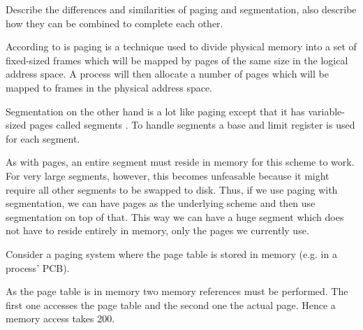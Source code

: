 \documentclass[a4paper]{miunasgn}
\theoremstyle{definition}
\begin{document}
\begin{questions}
	\question\label{q:segmentpaging}
	Describe the differences and similarities of paging and segmentation,
	also describe how they can be combined to complete each other.
	\begin{solution}
		According to \citet[sec. 8.4.1]{Silberschatz2009osc} is paging is 
		a technique used to divide physical memory into a set of fixed-sized frames 
		which will be mapped by pages of the same size in the logical address 
		space.
		A process will then allocate a number of pages which will be mapped to 
		frames in the physical address space.

		Segmentation on the other hand is a lot like paging except that it has 
		variable-sized pages called segments \citep[sec.  
		8.6.1]{Silberschatz2009osc}.
		To handle segments a base and limit register is used for each segment.

		As with pages, an entire segment must reside in memory for this scheme to 
		work.
		For very large segments, however, this becomes unfeasable because it might 
		require all other segments to be swapped to disk.
		Thus, if we use paging with segmentation, we can have pages as the 
		underlying scheme and then use segmentation on top of that.
		This way we can have a huge segment which does not have to reside entirely 
		in memory, only the pages we currently use.
	\end{solution}

	\question\label{q:accesstime}
	Consider a paging system where the page table is stored in memory (e.g. in 
	a process' PCB).
	\begin{solution}
		As the page table is in memory two memory references must be performed.
		The first one accesses the page table and the second one the actual page.
		Hence a memory access takes \unit{200}{\nano\second}.


\end{solution}
\end{questions}
\end{document}
